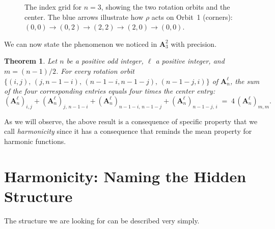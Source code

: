 \documentclass[a4paper,11pt]{article}
\theoremstyle{plain}
\newtheorem{theorem}{Theorem}
\theoremstyle{definition}
\theoremstyle{remark}
\newcommand{\A}{\mathbf{A}}
\begin{document}
\begin{figure}[ht]
\caption{The index grid for $n=3$, showing the two rotation orbits and the center.
The blue arrows illustrate how $\rho$ acts on Orbit~1 (corners):
$(0,0)\to(0,2)\to(2,2)\to(2,0)\to(0,0)$.}
\label{fig:rot}
\end{figure}

We can now state the phenomenon we noticed in $\A_3^2$ with precision.

\begin{theorem}
\label{thm:main}
Let $n$ be a positive odd integer, $\ell$ a positive integer, and $m=(n-1)/2$.
For every rotation orbit
$\{(i,j),\,(j,n{-}1{-}i),\,(n{-}1{-}i,n{-}1{-}j),\,(n{-}1{-}j,i)\}$
of $\A_n^\ell$, the sum of the four corresponding entries equals four times
the center entry:
\[
  (\A_n^\ell)_{i,j}
  +(\A_n^\ell)_{j,\,n-1-i}
  +(\A_n^\ell)_{n-1-i,\,n-1-j}
  +(\A_n^\ell)_{n-1-j,\,i}
  \;=\;4\,(\A_n^\ell)_{m,m}.
\]
\end{theorem}
As we will observe, the above result is a consequence of specific property that we call \textit{harmonicity} since it has a consequence that reminds the mean property for harmonic functions.





\section{Harmonicity: Naming the Hidden Structure}

The structure we are looking for can be described very simply.
\end{document}
